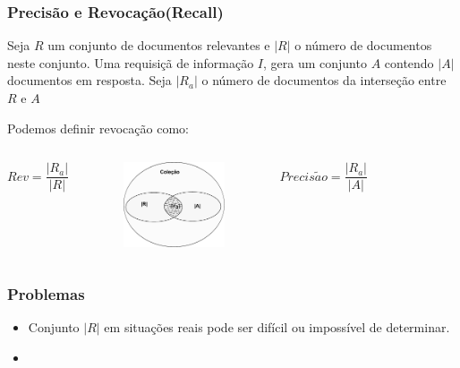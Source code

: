 \documentclass[compress]{beamer}
\begin{document}
\begin{frame}[fragile]
\frametitle{Precisão e Revocação(Recall)}
Seja $R$ um conjunto de documentos relevantes e $|R|$ o número de documentos neste conjunto. Uma requisiçã de informação $I$, gera um conjunto $A$ contendo $|A|$ documentos em resposta. Seja $|R_a|$ o número de documentos da interseção entre $R$ e $A$

Podemos definir revocação como:

\begin{columns}
 \column{3cm}
  \begin{equation*}
  Rev = \frac{|R_a|}{|R|}
  \end{equation*}
  \column{3cm}
  \begin{figure}[h!]
    \includegraphics[width=3cm]{./recall.pdf}
  \end{figure}
\column{4cm}
  \begin{equation*}
    Precis\tilde{a}o = \frac{|R_a|}{|A|}
  \end{equation*} 
\end{columns}
\end{frame}

\begin{frame}[fragile]
\frametitle{Problemas}
\begin{itemize}
 \item Conjunto $|R|$ em situações reais pode ser difícil ou impossível de determinar.
  \item 
\end{itemize}


\end{frame}
\end{document}
